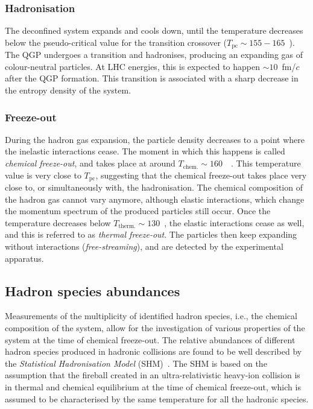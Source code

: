 \subsubsection{Hadronisation}
The deconfined system expands and cools down, until the temperature decreases below the pseudo-critical value for the transition crossover ($T_\mathrm{pc}\sim 155-165$~\mev). The QGP undergoes a transition and hadronises, producing an expanding gas of colour-neutral particles. At LHC energies, this is expected to happen $\sim 10$~fm/$c$~\cite{ALICE:2011dyt} after the QGP formation. This transition is associated with a sharp decrease in the entropy density of the system.

\subsubsection{Freeze-out}
During the hadron gas expansion, the particle density decreases to a point where the inelastic interactions cease. The moment in which this happens is called \emph{chemical freeze-out}, and takes place at around $T_\mathrm{chem.}\sim160$~\mev~\cite{Andronic:2017pug}. This temperature value is very close to $T_\mathrm{pc}$, suggesting that the chemical freeze-out takes place very close to, or simultaneously with, the hadronisation. The chemical composition of the hadron gas cannot vary anymore, although elastic interactions, which change the momentum spectrum of the produced particles still occur. Once the temperature decreases below $T_\mathrm{therm.}\sim 130$~\mev, the elastic interactions cease as well, and this is referred to as \emph{thermal freeze-out}. The particles then keep expanding without interactions (\emph{free-streaming}), and are detected by the experimental apparatus.

\subsection{Hadron species abundances}\label{subsec:SHM}
Measurements of the multiplicity of identified hadron species, i.e., the chemical composition of the system, allow for the investigation of various properties of the system at the time of chemical freeze-out. The relative abundances of different hadron species produced in hadronic collisions are found to be well described by the \emph{Statistical Hadronisation Model} (SHM)~\cite{Braun-Munzinger:2003pwq}. The SHM is based on the assumption that the fireball created in an ultra-relativistic heavy-ion collision is in thermal and chemical equilibrium at the time of chemical freeze-out, which is assumed to be characterised by the same temperature for all the hadronic species.

